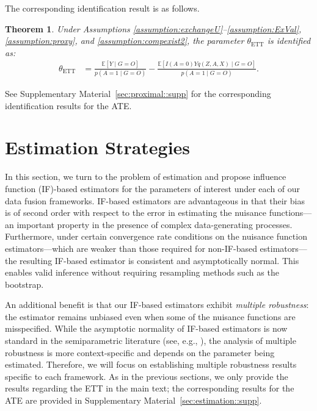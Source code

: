 \documentclass[10pt]{article}
\newtheorem{theorem}{Theorem}
\newcommand{\E}{\mathbb{E}}
\begin{document}
The corresponding identification result is as follows.
\begin{theorem}
\label{thm:PIPW}
Under Assumptions \ref{assumption:exchangeU}--\ref{assumption:ExVal}, \ref{assumption:proxy}, and \ref{assumption:compexist2}, the parameter \( \theta_{\text{ETT}} \) is identified as:
\begin{align}\label{eq:PIPW}
\theta_{\text{ETT}}
&= \frac{\E[Y \mid G=O]}{p(A=1 \mid G=O)} -
\frac{\E[I(A=0) Y q(Z, A, X) \mid G=O]}{p(A=1 \mid G=O)}.
\end{align}
\end{theorem}
See Supplementary Material~\ref{sec:proximal::supp} for the corresponding identification results for the ATE.


\section{Estimation Strategies}
\label{sec:estimation}

In this section, we turn to the problem of estimation and propose influence function (IF)-based estimators for the parameters of interest under each of our data fusion frameworks. IF-based estimators are advantageous in that their bias is of second order with respect to the error in estimating the nuisance functions—an important property in the presence of complex data-generating processes. Furthermore, under certain convergence rate conditions on the nuisance function estimators—which are weaker than those required for non-IF-based estimators—the resulting IF-based estimator is consistent and asymptotically normal. This enables valid inference without requiring resampling methods such as the bootstrap.

An additional benefit is that our IF-based estimators exhibit \emph{multiple robustness}: the estimator remains unbiased even when some of the nuisance functions are misspecified. While the asymptotic normality of IF-based estimators is now standard in the semiparametric literature (see, e.g., \citep{bickel1993efficient,newey1990semiparametric,tsiatis2007semiparametric,robins2017minimax,kennedy2024semiparametric}), the analysis of multiple robustness is more context-specific and depends on the parameter being estimated. Therefore, we will focus on establishing multiple robustness results specific to each framework.
As in the previous sections, 
we only provide the results regarding the ETT in the main text; the corresponding results for the ATE are provided in Supplementary Material~\ref{sec:estimation::supp}.
\end{document}
